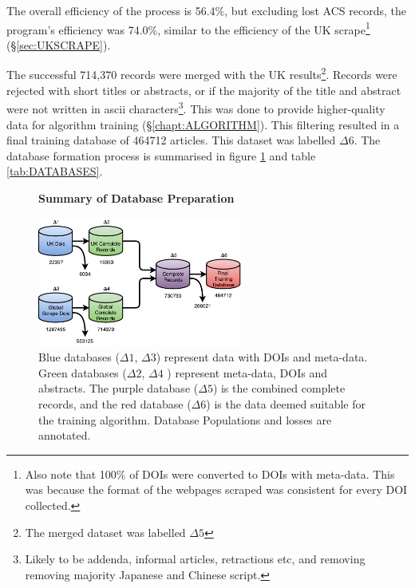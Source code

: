 The overall efficiency of the process is 56.4\%, but excluding lost ACS records, the program's efficiency was 74.0\%, similar to the efficiency of the UK scrape\footnote{Also note that 100\% of DOIs were converted to DOIs with meta-data. This was because the format of the webpages scraped was consistent for every DOI collected.} (\S\ref{sec:UKSCRAPE}).

The successful 714,370 records were merged with the UK results\footnote{The merged dataset was labelled $\Delta5$}. Records were rejected with short titles or abstracts, or if the majority of the title and abstract were not written in ascii characters\footnote{Likely to be addenda, informal articles, retractions etc, and removing removing majority Japanese and Chinese script.}. This was done to provide higher-quality data for algorithm training (\S\ref{chapt:ALGORITHM}). This filtering resulted in a final training database of 464712 articles. This dataset was labelled $\Delta6$. The database formation process is summarised in figure \ref{fig:DATABASES} and table \ref{tab:DATABASES}.
\begin{figure}[H]
    \centering
    \textbf{Summary of Database Preparation}\par\medskip
    \includegraphics[width=0.6\textwidth]{Data_Acquisition/Databases2.pdf}
    \caption[Summary of Database Preparation]{Blue databases ($\Delta1$, $\Delta3$) represent data with DOIs and meta-data. Green databases ($\Delta2$, $\Delta4$ ) represent meta-data, DOIs and abstracts. The purple database ($\Delta5$) is the combined complete records, and the red database ($\Delta6$) is the data deemed suitable for the training algorithm. Database Populations and losses are annotated.}
     \label{fig:DATABASES}
\end{figure}
